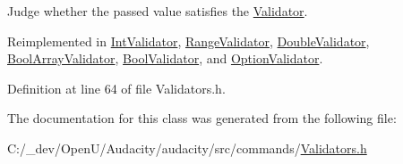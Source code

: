 Judge whether the passed value satisfies the \hyperlink{class_validator}{Validator}. 



Reimplemented in \hyperlink{class_int_validator_a899dfbd29207241b335049444bccbce3}{Int\+Validator}, \hyperlink{class_range_validator_adb54290bf883cfa1e61cad708c79b5d4}{Range\+Validator}, \hyperlink{class_double_validator_a41b7e1a6e57b7cb07ed4d12b0814ccb3}{Double\+Validator}, \hyperlink{class_bool_array_validator_a5f834e5f051e56a97ef098d21182a6d6}{Bool\+Array\+Validator}, \hyperlink{class_bool_validator_a3b14d9bb3ce532ecf54c9c6ce4e43830}{Bool\+Validator}, and \hyperlink{class_option_validator_a047507466786fdaa4dc252a2120d4ced}{Option\+Validator}.



Definition at line 64 of file Validators.\+h.



The documentation for this class was generated from the following file\+:\begin{DoxyCompactItemize}
\item 
C\+:/\+\_\+dev/\+Open\+U/\+Audacity/audacity/src/commands/\hyperlink{_validators_8h}{Validators.\+h}\end{DoxyCompactItemize}
